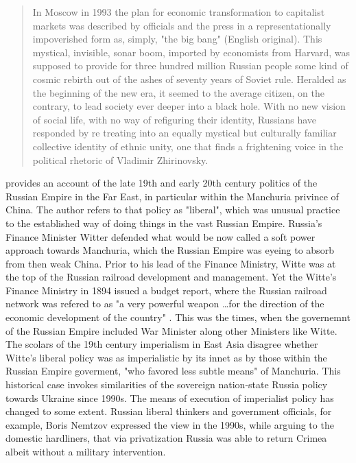 \begin{quote}
In Moscow in 1993 the plan for economic transformation to capitalist markets was described by officials and the press in a representationally impoverished form as,
 simply, "the big bang" (English original). This mystical, invisible, sonar
 boom, imported by economists from Harvard, was supposed to provide
 for three hundred million Russian people some kind of cosmic rebirth
 out of the ashes of seventy years of Soviet rule. Heralded as the beginning
 of the new era, it seemed to the average citizen, on the contrary, to lead
 society ever deeper into a black hole. With no new vision of social life,
 with no way of refiguring their identity, Russians have responded by re
 treating into an equally mystical but culturally familiar collective identity
 of ethnic unity, one that finds a frightening voice in the political rhetoric
 of Vladimir Zhirinovsky. \citep[p.~466]{buck-morss1995}
\end{quote}

\citep{wolff1999} provides an account of the late 19th and early 20th century politics of the Russian Empire in the Far East, in particular within the Manchuria privince of China. The author refers to that policy as "liberal", which was unusual practice to the established way of doing things in the vast Russian Empire. Russia's Finance Minister Witter defended what would be now called a soft power approach towards Manchuria, which the Russian Empire was eyeing to absorb from then weak China. Prior to his lead of the Finance Ministry, Witte was at the top of the Russian railroad development and management. Yet the Witte's Finance Ministry in 1894 issued a budget report, where the Russian railroad network was refered to as "a very powerful weapon \dots for the direction of the economic development of the country" \citep[p.~5]{wolff1999}. This was the times, when the governemnt of the Russian Empire included War Minister along other Ministers like Witte. The scolars of the 19th century imperialism in East Asia disagree whether Witte's liberal policy was as imperialistic by its innet as by those within the Russian Empire goverment, "who favored less subtle means" of Manchuria. This historical case invokes similarities of the sovereign nation-state Russia policy towards Ukraine since 1990s. The means of execution of imperialist policy has changed to some extent. Russian liberal thinkers and government officials, for example, Boris Nemtzov expressed the view in the 1990s, while arguing to the domestic hardliners, that via privatization Russia was able to return Crimea albeit without a military intervention.

